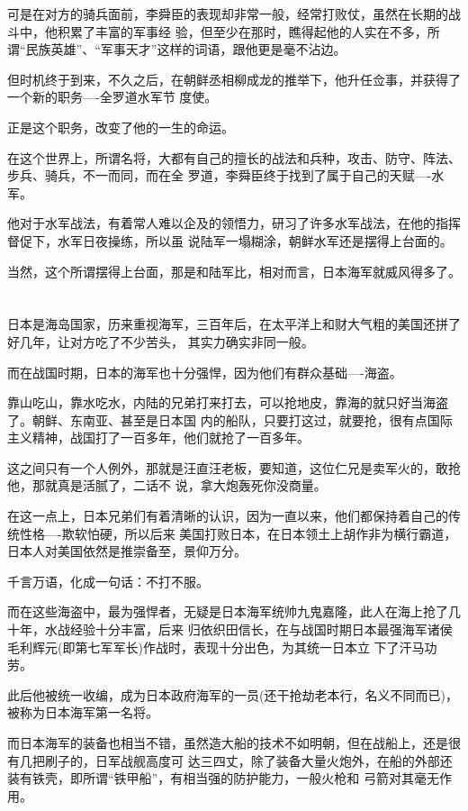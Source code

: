 \documentclass[11pt,a4paper,onecolumn]{article}
\begin{document}
可是在对方的骑兵面前，李舜臣的表现却非常一般，经常打败仗，虽然在长期的战斗中，他积累了丰富的军事经
验，但至少在那时，瞧得起他的人实在不多，所谓``民族英雄''、``军事天才''这样的词语，跟他更是毫不沾边。

但时机终于到来，不久之后，在朝鲜丞相柳成龙的推举下，他升任佥事，并获得了一个新的职务----全罗道水军节
度使。

正是这个职务，改变了他的一生的命运。

在这个世界上，所谓名将，大都有自己的擅长的战法和兵种，攻击、防守、阵法、步兵、骑兵，不一而同，而在全
罗道，李舜臣终于找到了属于自己的天赋----水军。

他对于水军战法，有着常人难以企及的领悟力，研习了许多水军战法，在他的指挥督促下，水军日夜操练，所以虽
说陆军一塌糊涂，朝鲜水军还是摆得上台面的。

当然，这个所谓摆得上台面，那是和陆军比，相对而言，日本海军就威风得多了。

\section[\thesection]{}

日本是海岛国家，历来重视海军，三百年后，在太平洋上和财大气粗的美国还拼了好几年，让对方吃了不少苦头，
其实力确实非同一般。

而在战国时期，日本的海军也十分强悍，因为他们有群众基础----海盗。

靠山吃山，靠水吃水，内陆的兄弟打来打去，可以抢地皮，靠海的就只好当海盗了。朝鲜、东南亚、甚至是日本国
内的船队，只要打这过，就要抢，很有点国际主义精神，战国打了一百多年，他们就抢了一百多年。

这之间只有一个人例外，那就是汪直汪老板，要知道，这位仁兄是卖军火的，敢抢他，那就真是活腻了，二话不
说，拿大炮轰死你没商量。

在这一点上，日本兄弟们有着清晰的认识，因为一直以来，他们都保持着自己的传统性格----欺软怕硬，所以后来
美国打败日本，在日本领土上胡作非为横行霸道，日本人对美国依然是推崇备至，景仰万分。

千言万语，化成一句话：不打不服。

而在这些海盗中，最为强悍者，无疑是日本海军统帅九鬼嘉隆，此人在海上抢了几十年，水战经验十分丰富，后来
归依织田信长，在与战国时期日本最强海军诸侯毛利辉元(即第七军军长)作战时，表现十分出色，为其统一日本立
下了汗马功劳。

此后他被统一收编，成为日本政府海军的一员(还干抢劫老本行，名义不同而已)，被称为日本海军第一名将。

而日本海军的装备也相当不错，虽然造大船的技术不如明朝，但在战船上，还是很有几把刷子的，日军战舰高度可
达三四丈，除了装备大量火炮外，在船的外部还装有铁壳，即所谓``铁甲船''，有相当强的防护能力，一般火枪和
弓箭对其毫无作用。
\end{document}
